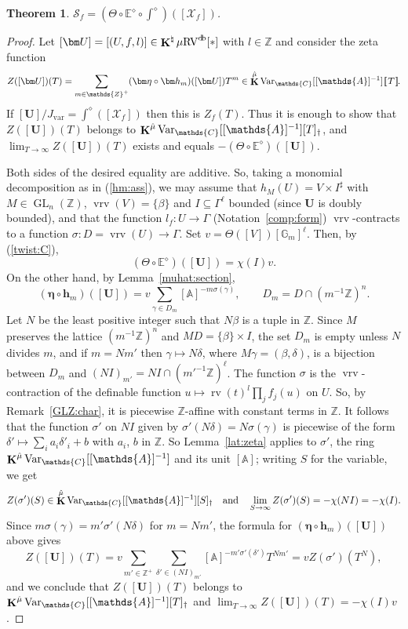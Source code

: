 \documentclass[12pt]{amsart}
\theoremstyle{plain}
\newtheorem{thm}{Theorem}[section]
\theoremstyle{definition}
\theoremstyle{remark}
\numberwithin{equation}{section}
\theoremstyle{plain}
\newcommand{\RV}{\textup{RV}}
\DeclareMathOperator{\GL}{GL}
\newcommand{\Z}{\mathds{Z}}
\newcommand{\A}{\mathds{A}}
\newcommand{\C}{\mathds{C}}
\newcommand{\G}{\mathds{G}}
\newcommand{\0}{\emptyset}
\newcommand{\dbra}[1]{%
  \,[\mkern-6.8mu[\, #1 \,]\mkern-6.8mu]}
\newcommand{\mdl}[1]{\mathcal{#1}}  %
\newcommand{\bb}[1]{\mathbb{#1}}
\newcommand{\limplies}{\rightarrow}
\newcommand{\fun}{\longrightarrow}
\newcommand{\efun}{\longmapsto}
\newcommand{\sub}{\subseteq}
\newcommand{\mgRV}{{\mu}{\RV}}
\DeclareMathOperator{\rv}{rv}
\DeclareMathOperator{\ggk}{\mathbf{K}}
\DeclareMathOperator{\vrv}{vrv}
\DeclareMathOperator{\db}{d \! b}
\newcommand{\var}{\textup{Var}}
\newcommand{\gmv}{\ggk^{\hat \mu}\var_{\C}}
\begin{document}
\begin{thm}\label{direct:mil}
$\mathscr S_f = (\Theta \circ \bb E^{\diamond} \circ \int^{\diamond})([\mdl X_f])$.
\end{thm}
\begin{proof}
Let $[\bm U] = [(U, f, l)] \in \ggk^\natural \mgRV^{\db}[*]$ with $l \in \Z$  and consider the zeta function
\begin{equation}\label{U:zeta}
Z([\bm U])(T) = \sum_{m \in \Z^+} (\bm \eta \circ \bm h_m)([\bm U]) T^m \in \gmv[[\A]^{-1}]\dbra T.
\end{equation}
If $[\bm U] / J_{\mathrm{var}} = \int^{\diamond}([\mdl X_f])$ then this is $Z_f(T)$. Thus it is enough to show that  $Z([\bm U])(T)$ belongs to $\gmv[[\A]^{-1}][T]_{\dag}$, and $\lim_{T \limplies \infty} Z([\bm U])(T)$ exists and equals $- (\Theta \circ \bb E^{\diamond})([\bm U])$.

Both sides of the desired equality are additive. So, taking a monomial decomposition as in (\ref{hm:ass}), we may assume that $h_M(U) = V \times I^\sharp$ with $M \in \GL_n(\Z)$, $\vrv(V) = \{\beta\}$ and $I \sub \Gamma^\ell$ bounded (since $\bm U$ is doubly bounded), and that the function $l_f: U \fun \Gamma$ (Notation~\ref{comp:form}) $\vrv$-contracts to a function $\sigma : D = \vrv(U) \fun \Gamma$.  Set $v = \Theta([V]) [\G_m]^\ell$. Then, by (\ref{twist:C}),
\[
(\Theta \circ \bb E^{\diamond})([\bm U]) = \chi(I) v.
\]
On the other hand, by Lemma~\ref{muhat:section},
\[
(\bm \eta \circ \bm h_m)([\bm U]) = v \sum_{\gamma \in D_m} [\A]^{-m \sigma(\gamma)}, \qquad D_m = D \cap (m^{-1}\Z)^n.
\]
Let $N$ be the least positive integer such that $N \beta$ is a tuple in $\Z$. Since $M$ preserves the lattice $(m^{-1}\Z)^n$ and $M D = \{\beta\} \times I$, the set $D_m$ is empty unless $N$ divides $m$, and if $m = N m'$ then $\gamma \efun N \delta$, where $M \gamma = (\beta, \delta)$, is a bijection between $D_m$ and $(N I)_{m'} = N I \cap (m'^{-1}\Z)^\ell$. The function $\sigma$ is the $\vrv$-contraction of the definable function $u \efun \rv(t)^l \prod_j f_j(u)$ on $U$. So, by Remark~\ref{GLZ:char}, it is piecewise $\Z$-affine with constant terms in $\Z$. It follows that the function $\sigma'$ on $N I$ given by $\sigma'(N \delta) = N \sigma(\gamma)$ is piecewise of the form $\delta' \efun \sum_i a_i \delta'_i + b$ with $a_i$, $b$ in $\Z$. So Lemma~\ref{lat:zeta} applies to $\sigma'$, the ring $\gmv[[\A]^{-1}]$ and its unit $[\A]$; writing $S$ for the variable, we get
\[
Z(\sigma')(S) \in \gmv[[\A]^{-1}][S]_{\dag} \quad \text{and} \quad \lim_{S \limplies \infty}Z(\sigma')(S) = -\chi(N I) = - \chi(I).
\]
Since $m \sigma(\gamma) = m' \sigma'(N \delta)$ for $m = N m'$, the formula for $(\bm \eta \circ \bm h_m)([\bm U])$ above gives
\[
Z([\bm U])(T) = v \sum_{m' \in \Z^+} \sum_{\delta' \in (N I)_{m'}} [\A]^{-m' \sigma'(\delta')} T^{N m'} = v Z(\sigma')(T^N),
\]
and we conclude that $Z([\bm U])(T)$ belongs to $\gmv[[\A]^{-1}][T]_{\dag}$ and $\lim_{T \limplies \infty}Z([\bm U])(T) = - \chi(I) v$.


\end{proof}
\end{document}
